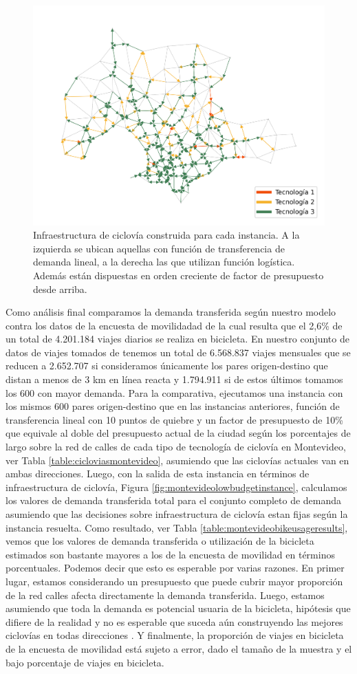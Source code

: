 \begin{figure}[h!]
  \includegraphics[width=.49\linewidth]{../resources/montevideo_d3000.0_inv_logit_1.6_budget_factor.png}
  \caption{Infraestructura de ciclovía construida para cada instancia. A la izquierda se ubican aquellas con función de transferencia de demanda lineal, a la derecha las que utilizan función logística. Además están dispuestas en orden creciente de factor de presupuesto desde arriba.}
  \label{fig:montevideo_instances_infras}
\end{figure}

Como análisis final comparamos la demanda transferida según nuestro modelo contra los datos de la encuesta de movilidadad \textcite{Mauttone2017a} de la cual resulta que el 2,6\% de un total de 4.201.184 viajes diarios se realiza en bicicleta. En nuestro conjunto de datos de viajes tomados de \textcite{Massobrio2020} tenemos un total de 6.568.837 viajes mensuales que se reducen a 2.652.707 si consideramos únicamente los pares origen-destino que distan a menos de 3 km en línea reacta y 1.794.911 si de estos últimos tomamos los 600 con mayor demanda. Para la comparativa, ejecutamos una instancia con los mismos 600 pares origen-destino que en las instancias anteriores, función de transferencia lineal con 10 puntos de quiebre y un factor de presupuesto de 10\% que equivale al doble del presupuesto actual de la ciudad según los porcentajes de largo sobre la red de calles de cada tipo de tecnología de ciclovía en Montevideo, ver Tabla \ref{table:cicloviasmontevideo}, asumiendo que las ciclovías actuales van en ambas direcciones. Luego, con la salida de esta instancia en términos de infraestructura de ciclovía, Figura \ref{fig:montevideolowbudgetinstance}, calculamos los valores de demanda transferida total para el conjunto completo de demanda asumiendo que las decisiones sobre infraestructura de ciclovía estan fijas según la instancia resuelta. Como resultado, ver Tabla \ref{table:montevideobikeusageresults}, vemos que los valores de demanda transferida o utilización de la bicicleta estimados son bastante mayores a los de la encuesta de movilidad en términos porcentuales. Podemos decir que esto es esperable por varias razones. En primer lugar, estamos considerando un presupuesto que puede cubrir mayor proporción de la red calles afecta directamente la demanda transferida. Luego, estamos asumiendo que toda la demanda es potencial usuaria de la bicicleta, hipótesis que difiere de la realidad y no es esperable que suceda aún construyendo las mejores ciclovías en todas direcciones \parencite{shwe2014}. Y finalmente, la proporción de viajes en bicicleta de la encuesta de movilidad está sujeto a error, dado el tamaño de la muestra y el bajo porcentaje de viajes en bicicleta.

